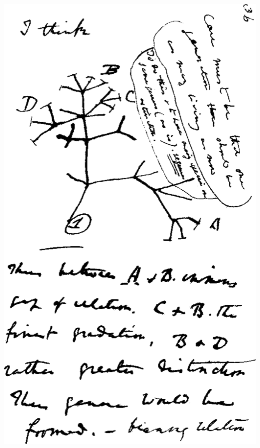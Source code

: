 \begin{frame}
\begin{columns}[c]
        \includegraphics[width=\textwidth]{images/darwin_tree}
    \end{columns}  
\end{frame}

